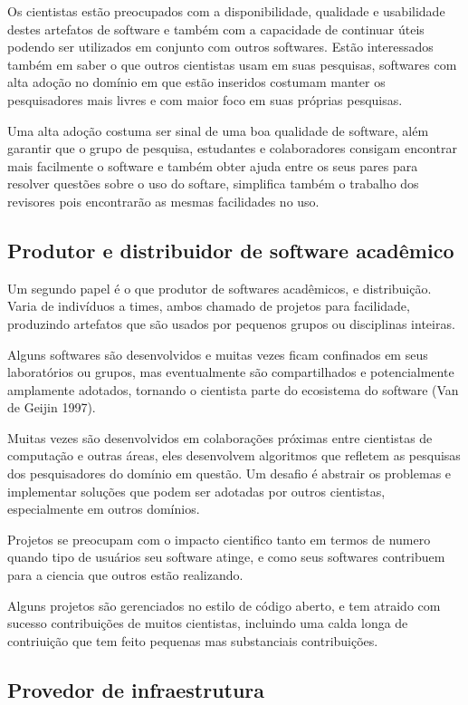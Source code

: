 Os cientistas estão preocupados com a disponibilidade, qualidade e usabilidade
destes artefatos de software e também com a capacidade de continuar úteis
podendo ser utilizados em conjunto com outros softwares. Estão interessados
também em saber o que outros cientistas usam em suas pesquisas, softwares com
alta adoção no domínio em que estão inseridos costumam manter os pesquisadores
mais livres e com maior foco em suas próprias pesquisas.

Uma alta adoção costuma ser sinal de uma boa qualidade de software, além
garantir que o grupo de pesquisa, estudantes e colaboradores consigam encontrar
mais facilmente o software e também obter ajuda entre os seus pares para
resolver questões sobre o uso do softare, simplifica também o trabalho dos
revisores pois encontrarão as mesmas facilidades no uso.

\subsection{Produtor e distribuidor de software acadêmico}

Um segundo papel é o que produtor de softwares acadêmicos, e distribuição. Varia
de indivíduos a times, ambos chamado de projetos para facilidade, produzindo
artefatos que são usados por pequenos grupos ou disciplinas inteiras.

Alguns softwares são desenvolvidos e muitas vezes ficam confinados em seus laboratórios
ou grupos, mas eventualmente são compartilhados e potencialmente amplamente adotados, tornando
o cientista parte do ecosistema do software (Van de Geijin 1997).

Muitas vezes são desenvolvidos em colaborações próximas entre cientistas de computação e
outras áreas, eles desenvolvem algoritmos que refletem as pesquisas dos pesquisadores
do domínio em questão. Um desafio é abstrair os problemas e implementar soluções que
podem ser adotadas por outros cientistas, especialmente em outros domínios.

Projetos se preocupam com o impacto cientifico tanto em termos de numero quando
tipo de usuários seu software atinge, e como seus softwares contribuem para a
ciencia que outros estão realizando.

Alguns projetos são gerenciados no estilo de código aberto, e tem
atraido com sucesso contribuições de muitos cientistas, incluindo
uma calda longa de contriuição que tem feito pequenas mas substanciais
contribuições.

\subsection{Provedor de infraestrutura}

